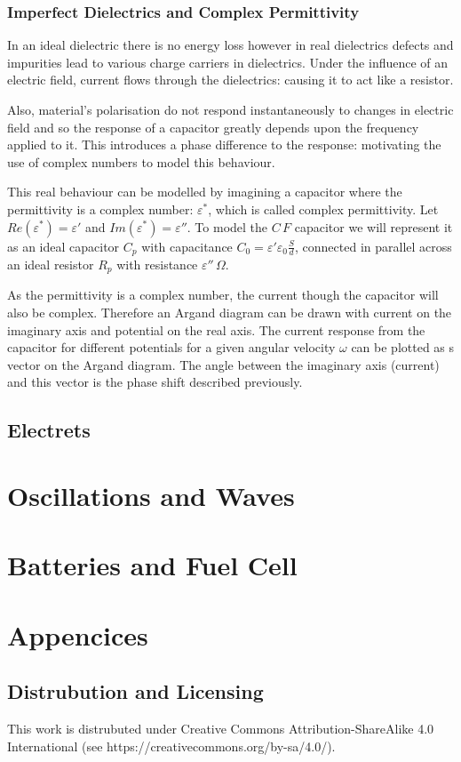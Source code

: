 \documentclass[11pt,a4paper]{report}
\begin{document}
\subsection{Imperfect Dielectrics and Complex Permittivity}
In an ideal dielectric there is no energy loss however in real dielectrics defects and impurities lead to various charge carriers in dielectrics. Under the influence of an electric field, current flows through the dielectrics: causing it to act like a resistor. 

Also, material's polarisation do not respond instantaneously to changes in electric field and so the response of a capacitor greatly depends upon the frequency applied to it. This introduces a phase difference to the response: motivating the use of complex numbers to model this behaviour.

This real behaviour can be modelled by imagining a capacitor where the permittivity is a complex number: $\varepsilon^*$, which is called complex permittivity. Let $Re(\varepsilon^*)=\varepsilon'$ and $Im(\varepsilon^*)=\varepsilon''$. To model the $C \, F$ capacitor we will represent it as an ideal capacitor $C_p$ with capacitance $C_0 =\varepsilon'\varepsilon_0\frac{S}{d}$, connected in parallel across an ideal resistor $R_p$ with resistance $\varepsilon'' \, \Omega$.

As the permittivity is a complex number, the current though the capacitor will also be complex. Therefore an Argand diagram can be drawn with current on the imaginary axis and potential on the real axis. The current response from the capacitor for different potentials for a given angular velocity $\omega$ can be plotted as s vector on the Argand diagram. The angle between the imaginary axis (current) and this vector is the phase shift described previously.

\section{Electrets}

\chapter{Oscillations and Waves}

\chapter{Batteries and Fuel Cell}

\chapter{Appencices}
\section{Distrubution and Licensing}
This work is distrubuted under Creative Commons Attribution-ShareAlike 4.0
International (see https://creativecommons.org/by-sa/4.0/).
\end{document}

